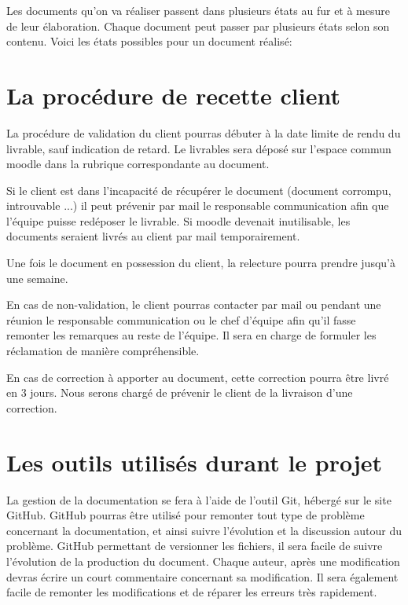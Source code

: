 Les documents qu'on va réaliser passent dans plusieurs états au fur et à mesure de leur élaboration. Chaque document peut passer par plusieurs états selon son contenu. Voici les états possibles pour un document réalisé:



\section{La procédure de recette client}

La procédure de validation du client pourras débuter à la date limite de rendu du livrable, sauf indication de retard. Le livrables sera déposé sur l'espace commun moodle dans la rubrique correspondante au document.

Si le client est dans l’incapacité de récupérer le document (document corrompu, introuvable ...) il peut prévenir par mail le responsable communication afin que l’équipe puisse redéposer le livrable.
Si moodle devenait inutilisable, les documents seraient livrés au client par mail temporairement.

Une fois le document en possession du client, la relecture pourra prendre jusqu’à une semaine.

En cas de non-validation, le client pourras contacter par mail ou pendant une réunion le responsable communication ou le chef d’équipe afin qu’il fasse remonter les remarques au reste de l’équipe.
Il sera en charge de formuler les réclamation de manière compréhensible.

En cas de correction à apporter au document, cette correction pourra être livré en 3 jours.
Nous serons chargé de prévenir le client de la livraison d’une correction.

\section{Les outils utilisés durant le projet}

La gestion de la documentation se fera à l’aide de l’outil Git, hébergé sur le site GitHub.
GitHub pourras être utilisé pour remonter tout type de problème concernant la documentation, et ainsi suivre l'évolution et la discussion autour du problème.
GitHub permettant de versionner les fichiers, il sera facile de suivre l'évolution de la production du document.
Chaque auteur, après une modification devras écrire un court commentaire concernant sa modification.
Il sera également facile de remonter les modifications et de réparer les erreurs très rapidement.

